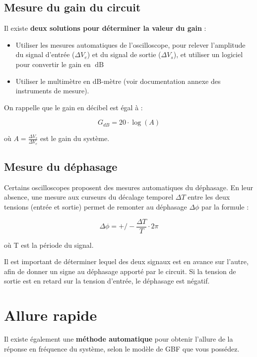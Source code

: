 \newpage
\subsection{Mesure du gain du circuit}

Il existe \textbf{deux solutions pour déterminer la valeur du gain} :

\begin{itemize}
	\item Utiliser les mesures automatiques de l'oscilloscope, pour relever l'amplitude du signal d'entrée ($\Delta{}V_e$) et du signal de sortie ($\Delta{}V_s$), et utiliser un logiciel pour convertir le gain en $\operatorname{dB}$
	\item Utiliser le multimètre en dB-mètre (voir documentation annexe des instruments de mesure).
\end{itemize}

\medskip

On rappelle que le gain en décibel est égal à :

$$G_{dB} = 20 \cdot \log(A)$$

où $A = \frac{\Delta{}V_s}{\Delta{}V_e}$ est le gain du système.

\subsection{Mesure du déphasage}

Certains oscilloscopes proposent des mesures automatiques du déphasage. En leur absence, une mesure aux curseurs du décalage temporel $\Delta{}T$ entre les deux tensions (entrée et sortie) permet de remonter au déphasage $\Delta{}\phi$ par la formule :

$$\Delta{}\phi = +/- \frac{\Delta{}T}{T} \cdot 2\pi$$

où T est la période du signal.

Il est important de déterminer lequel des deux signaux est en avance sur l'autre, afin de donner un signe au déphasage apporté par le circuit. Si la tension de sortie est en retard sur la tension d'entrée, le déphasage est négatif.

\newpage
\section{Allure rapide}

Il existe également une \textbf{méthode automatique} pour obtenir l'allure de la réponse en fréquence du système, selon le modèle de GBF que vous possédez.

